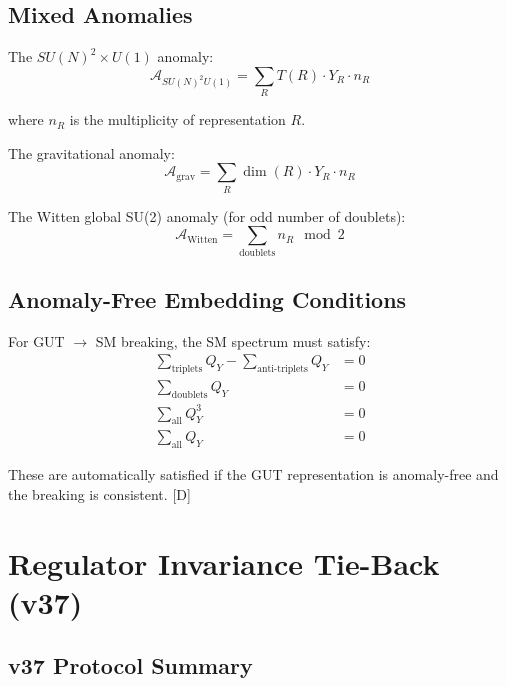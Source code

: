 \documentclass[11pt,a4paper]{article}
\newcommand{\tagD}{\textcolor{blue!70!black}{[D]}}
\begin{document}
\subsection{Mixed Anomalies}

The $SU(N)^2 \times U(1)$ anomaly:
\begin{equation}
\label{eq:mixed-su2-u1}
\mathcal{A}_{SU(N)^2 U(1)} = \sum_R T(R) \cdot Y_R \cdot n_R
\end{equation}

where $n_R$ is the multiplicity of representation $R$.

The gravitational anomaly:
\begin{equation}
\label{eq:grav-anomaly-formula}
\mathcal{A}_{\text{grav}} = \sum_R \dim(R) \cdot Y_R \cdot n_R
\end{equation}

The Witten global SU(2) anomaly (for odd number of doublets):
\begin{equation}
\label{eq:witten-anomaly}
\mathcal{A}_{\text{Witten}} = \sum_{\text{doublets}} n_R \mod 2
\end{equation}

\subsection{Anomaly-Free Embedding Conditions}

For GUT $\to$ SM breaking, the SM spectrum must satisfy:
\begin{align}
\label{eq:embed-su3}
\sum_{\text{triplets}} Q_Y - \sum_{\text{anti-triplets}} Q_Y &= 0 \\
\label{eq:embed-su2}
\sum_{\text{doublets}} Q_Y &= 0 \\
\label{eq:embed-u1}
\sum_{\text{all}} Q_Y^3 &= 0 \\
\label{eq:embed-grav}
\sum_{\text{all}} Q_Y &= 0
\end{align}

These are automatically satisfied if the GUT representation is anomaly-free and the breaking is consistent. \tagD

\section{Regulator Invariance Tie-Back (v37)}
\label{app:regulator}

\subsection{v37 Protocol Summary}
\end{document}
